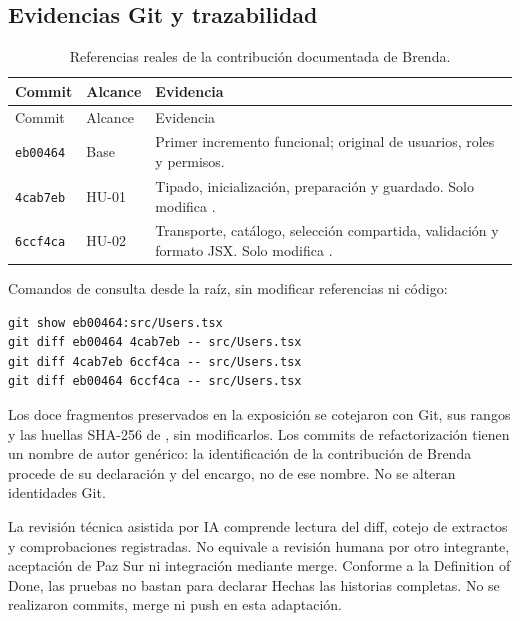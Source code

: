 \subsection{Evidencias Git y trazabilidad}
\begin{longtable}{P{2cm}P{2cm}P{8cm}}
\caption{Referencias reales de la contribución documentada de Brenda.}\\
\toprule Commit & Alcance & Evidencia \\ \midrule
\endfirsthead
\toprule Commit & Alcance & Evidencia \\ \midrule
\endhead
\texttt{eb00464} & Base & Primer incremento funcional; original de usuarios, roles y permisos. \\
\texttt{4cab7eb} & HU-01 & Tipado, inicialización, preparación y guardado. Solo modifica . \\
\texttt{6ccf4ca} & HU-02 & Transporte, catálogo, selección compartida, validación y formato JSX. Solo modifica . \\
\bottomrule
\end{longtable}
Comandos de consulta desde la raíz, sin modificar referencias ni código:
\begin{lstlisting}[language={},numbers=none,caption={Consultas reproducibles de la evidencia Git.}]
git show eb00464:src/Users.tsx
git diff eb00464 4cab7eb -- src/Users.tsx
git diff 4cab7eb 6ccf4ca -- src/Users.tsx
git diff eb00464 6ccf4ca -- src/Users.tsx
\end{lstlisting}
Los doce fragmentos preservados en la exposición se cotejaron con Git, sus rangos y las huellas SHA-256 de , sin modificarlos. Los commits de refactorización tienen un nombre de autor genérico: la identificación de la contribución de Brenda procede de su declaración y del encargo, no de ese nombre. No se alteran identidades Git.

La revisión técnica asistida por IA comprende lectura del diff, cotejo de extractos y comprobaciones registradas. No equivale a revisión humana por otro integrante, aceptación de Paz Sur ni integración mediante merge. Conforme a la Definition of Done, las pruebas no bastan para declarar Hechas las historias completas. No se realizaron commits, merge ni push en esta adaptación.
